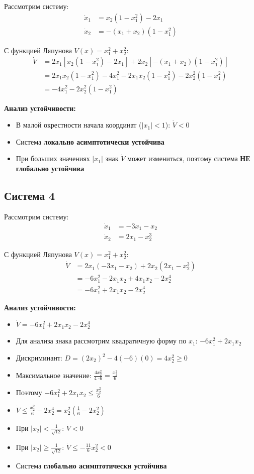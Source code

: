 Рассмотрим систему:
\begin{align}
\dot{x}_1 &= x_2(1 - x_1^2) - 2x_1 \\
\dot{x}_2 &= -(x_1 + x_2)(1 - x_1^2)
\end{align}

С функцией Ляпунова $V(x) = x_1^2 + x_2^2$:
\begin{align}
\dot{V} &= 2x_1[x_2(1 - x_1^2) - 2x_1] + 2x_2[-(x_1 + x_2)(1 - x_1^2)] \\
&= 2x_1 x_2(1 - x_1^2) - 4x_1^2 - 2x_1 x_2(1 - x_1^2) - 2x_2^2(1 - x_1^2) \\
&= -4x_1^2 - 2x_2^2(1 - x_1^2)
\end{align}

\textbf{Анализ устойчивости:}
\begin{itemize}
\item В малой окрестности начала координат ($|x_1| < 1$): $\dot{V} < 0$
\item Система \textbf{локально асимптотически устойчива}
\item При больших значениях $|x_1|$ знак $\dot{V}$ может измениться, поэтому система \textbf{НЕ глобально устойчива}
\end{itemize}

\subsection{Система 4}

Рассмотрим систему:
\begin{align}
\dot{x}_1 &= -3x_1 - x_2 \\
\dot{x}_2 &= 2x_1 - x_2^3
\end{align}

С функцией Ляпунова $V(x) = x_1^2 + x_2^2$:
\begin{align}
\dot{V} &= 2x_1(-3x_1 - x_2) + 2x_2(2x_1 - x_2^3) \\
&= -6x_1^2 - 2x_1 x_2 + 4x_1 x_2 - 2x_2^4 \\
&= -6x_1^2 + 2x_1 x_2 - 2x_2^4
\end{align}

\textbf{Анализ устойчивости:}
\begin{itemize}
\item $\dot{V} = -6x_1^2 + 2x_1 x_2 - 2x_2^4$
\item Для анализа знака рассмотрим квадратичную форму по $x_1$: $-6x_1^2 + 2x_1 x_2$
\item Дискриминант: $D = (2x_2)^2 - 4(-6)(0) = 4x_2^2 \geq 0$
\item Максимальное значение: $\frac{4x_2^2}{4 \cdot 6} = \frac{x_2^2}{6}$
\item Поэтому $-6x_1^2 + 2x_1 x_2 \leq \frac{x_2^2}{6}$
\item $\dot{V} \leq \frac{x_2^2}{6} - 2x_2^4 = x_2^2(\frac{1}{6} - 2x_2^2)$
\item При $|x_2| < \frac{1}{\sqrt{12}}$: $\dot{V} < 0$
\item При $|x_2| \geq \frac{1}{\sqrt{12}}$: $\dot{V} \leq -\frac{11}{6}x_2^2 < 0$
\item Система \textbf{глобально асимптотически устойчива}
\end{itemize}

